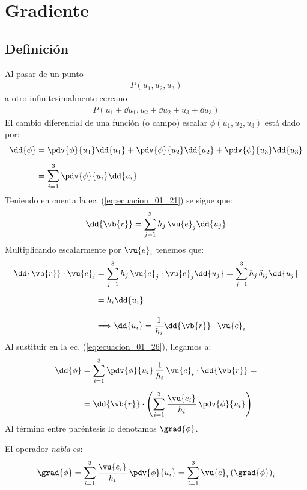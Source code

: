 \section{Gradiente}
\subsection{Definición}
Al pasar de un punto 
\begin{align*}
P(u_{1}, u_{2}, u_{3})
\end{align*}
a otro infinitesimalmente cercano 
\begin{align*}
P(u_{1} + \dd{u}_{1}, u_{2} + \dd{u_{2}} + u_{3} + \dd{u_{3}})
\end{align*}
El cambio diferencial de una función (o campo) escalar $\phi(u_{1}, u_{2}, u_{3})$ está dado por:
\begin{align}
\begin{aligned}
\dd{\phi} &= \pdv{\phi}{u_{1}} \dd{u_{1}} + \pdv{\phi}{u_{2}} \dd{u_{2}} + \pdv{\phi}{u_{3}} \dd{u_{3}} \\[0.5em]
&= \sum_{i=1}^{3} \pdv{\phi}{u_{i}} \dd{u_{i}}
\end{aligned}
\label{eq:ecuacion_01_26}
\end{align}
Teniendo en cuenta la ec. (\ref{eq:ecuacion_01_21}) se sigue que:
\begin{align}
\dd{\vb{r}} = \sum_{j=1}^{3} h_{j} \, \vu{e}_{j} \dd{u_{j}}
\label{eq:ecuacion_01_27}
\end{align}
Multiplicando escalarmente por $\vu{e}_{i}$ tenemos que:
\begin{align*}
\dd{\vb{r}} \cdot \vu{e}_{i} &= \sum_{j=1}^{3} h_{j} \, \vu{e}_{j} \cdot \vu{e}_{j} \dd{u_{j}} = \sum_{j=1}^{3} h_{j} \, \delta_{ij} \dd{u_{j}} \\[0.5em]
&= h_{i} \dd{u_{i}} \\[1em]
&\Longrightarrow \dd{u_{i}} = \dfrac{1}{h_{i}} \dd{\vb{r}} \cdot \vu{e}_{i}
\end{align*}
Al sustituir en la ec. (\ref{eq:ecuacion_01_26}), llegamos a:
\begin{align*}
\dd{\phi} &= \sum_{i=1}^{3} \pdv{\phi}{u_{i}} \, \dfrac{1}{h_{i}} \, \vu{e}_{i} \cdot \dd{\vb{r}} = \\[0.5em]
&= \dd{\vb{r}} \cdot \left( \sum_{i=1}^{3} \dfrac{\vu{e_{i}}}{h_{i}} \, \pdv{\phi}{u_{i}} \right)
\end{align*}
Al término entre paréntesis lo denotamos $\grad{\phi}$.
\par
El operador \emph{nabla} es:
\begin{align}
\grad{\phi} = \sum_{i=1}^{3} \dfrac{\vu{e_{i}}}{h_{i}} \, \pdv{\phi}{u_{i}} = \sum_{i=1}^{3} \vu{e}_{i} \left( \grad{\phi} \right)_{i}
\label{eq:ecuacion_01_28}
\end{align}

